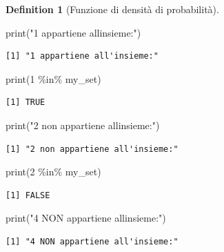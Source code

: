 \documentclass[
  letterpaper,
  DIV=11,
  numbers=noendperiod,
  oneside]{scrreprt}
\newenvironment{Shaded}{\begin{snugshade}}{\end{snugshade}}
\newcommand{\DecValTok}[1]{\textcolor[rgb]{0.68,0.00,0.00}{#1}}
\newcommand{\FunctionTok}[1]{\textcolor[rgb]{0.28,0.35,0.67}{#1}}
\newcommand{\NormalTok}[1]{\textcolor[rgb]{0.00,0.23,0.31}{#1}}
\newcommand{\SpecialCharTok}[1]{\textcolor[rgb]{0.37,0.37,0.37}{#1}}
\newcommand{\StringTok}[1]{\textcolor[rgb]{0.13,0.47,0.30}{#1}}
\theoremstyle{definition}
\theoremstyle{plain}
\theoremstyle{definition}
\newtheorem{definition}{Definition}[chapter]
\theoremstyle{remark}
\begin{document}
\begin{definition}[Funzione di densità di
probabilità]
\begin{Shaded}
\begin{Highlighting}[]
\FunctionTok{print}\NormalTok{(}\StringTok{"1 appartiene all\textquotesingle{}insieme:"}\NormalTok{)}
\end{Highlighting}
\end{Shaded}

\begin{verbatim}
[1] "1 appartiene all'insieme:"
\end{verbatim}

\begin{Shaded}
\begin{Highlighting}[]
\FunctionTok{print}\NormalTok{(}\DecValTok{1} \SpecialCharTok{\%in\%}\NormalTok{ my\_set)}
\end{Highlighting}
\end{Shaded}

\begin{verbatim}
[1] TRUE
\end{verbatim}

\begin{Shaded}
\begin{Highlighting}[]
\FunctionTok{print}\NormalTok{(}\StringTok{"2 non appartiene all\textquotesingle{}insieme:"}\NormalTok{)}
\end{Highlighting}
\end{Shaded}

\begin{verbatim}
[1] "2 non appartiene all'insieme:"
\end{verbatim}

\begin{Shaded}
\begin{Highlighting}[]
\FunctionTok{print}\NormalTok{(}\DecValTok{2} \SpecialCharTok{\%in\%}\NormalTok{ my\_set)}
\end{Highlighting}
\end{Shaded}

\begin{verbatim}
[1] FALSE
\end{verbatim}

\begin{Shaded}
\begin{Highlighting}[]
\FunctionTok{print}\NormalTok{(}\StringTok{"4 NON appartiene all\textquotesingle{}insieme:"}\NormalTok{)}
\end{Highlighting}
\end{Shaded}

\begin{verbatim}
[1] "4 NON appartiene all'insieme:"
\end{verbatim}


\end{definition}
\end{document}
